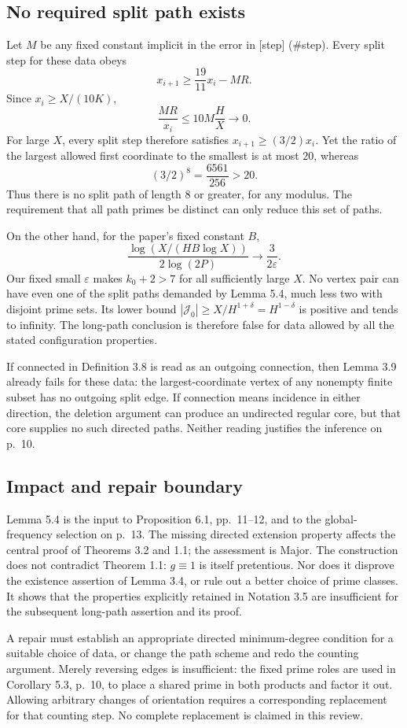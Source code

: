 \documentclass[10pt]{article}
\begin{document}
\subsection*{No required split path exists}
Let \(M\) be any fixed constant implicit in the error in [step] (\#step). Every split step for these data obeys \[x_{i+1}\ge \frac{19}{11}x_i-MR.\] Since \(x_i\ge X/(10K)\), \[\frac{MR}{x_i}\le 10M\frac HX\longrightarrow0.\] For large \(X\), every split step therefore satisfies \(x_{i+1}\ge(3/2)x_i\). Yet the ratio of the largest allowed first coordinate to the smallest is at most \(20\), whereas \[(3/2)^8=\frac{6561}{256}>20.\] Thus there is no split path of length \(8\) or greater, for any modulus. The requirement that all path primes be distinct can only reduce this set of paths.\par
On the other hand, for the paper’s fixed constant \(B\), \[\frac{\log(X/(HB\log X))}{2\log(2P)}
       \longrightarrow \frac{3}{2\varepsilon}.\] Our fixed small \(\varepsilon\) makes \(k_0+2>7\) for all sufficiently large \(X\). No vertex pair can have even one of the split paths demanded by Lemma 5.4, much less two with disjoint prime sets. Its lower bound \(|\mathcal J_0|\ge X/H^{1+\delta}=H^{1-\delta}\) is positive and tends to infinity. The long-path conclusion is therefore false for data allowed by all the stated configuration properties.\par
If connected in Definition 3.8 is read as an outgoing connection, then Lemma 3.9 already fails for these data: the largest-coordinate vertex of any nonempty finite subset has no outgoing split edge. If connection means incidence in either direction, the deletion argument can produce an undirected regular core, but that core supplies no such directed paths. Neither reading justifies the inference on p. 10.\par
\subsection*{Impact and repair boundary}
Lemma 5.4 is the input to Proposition 6.1, pp. 11–12, and to the global-frequency selection on p. 13. The missing directed extension property affects the central proof of Theorems 3.2 and 1.1; the assessment is Major. The construction does not contradict Theorem 1.1: \(g\equiv1\) is itself pretentious. Nor does it disprove the existence assertion of Lemma 3.4, or rule out a better choice of prime classes. It shows that the properties explicitly retained in Notation 3.5 are insufficient for the subsequent long-path assertion and its proof.\par
A repair must establish an appropriate directed minimum-degree condition for a suitable choice of data, or change the path scheme and redo the counting argument. Merely reversing edges is insufficient: the fixed prime roles are used in Corollary 5.3, p. 10, to place a shared prime in both products and factor it out. Allowing arbitrary changes of orientation requires a corresponding replacement for that counting step. No complete replacement is claimed in this review.\par
\end{document}
